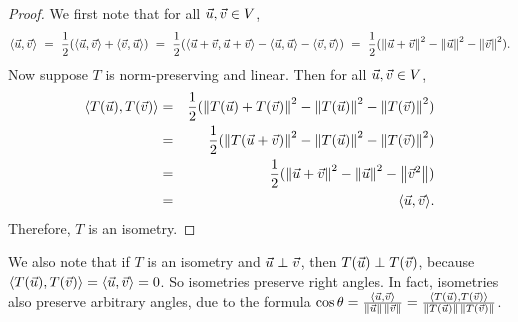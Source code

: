 \documentclass{ximera}
\begin{document}
\begin{proof}
  We first note that for all $\vec{u},\vec{v}\in V$,
  \begin{equation*}
    \langle \vec{u},\vec{v} \rangle
    ~=~ \frac{1}{2}(\langle \vec{u},\vec{v} \rangle + \langle \vec{v},\vec{u} \rangle)
    ~=~ \frac{1}{2}(\langle \vec{u}+\vec{v},\vec{u}+\vec{v} \rangle
    - \langle \vec{u},\vec{u} \rangle - \langle \vec{v},\vec{v} \rangle)
    ~=~ \frac{1}{2}(\left\|\vec{u}+\vec{v}\right\|^2
    - \left\|\vec{u}\right\|^2 - \left\|\vec{v}\right\|^2).
  \end{equation*}
  Now suppose $T$ is norm-preserving and linear. Then for all
  $\vec{u},\vec{v}\in V$,
  \begin{eqnarray*}
    \langle T(\vec{u}),T(\vec{v}) \rangle
    &=& \frac{1}{2}(\left\|T(\vec{u})+T(\vec{v})\right\|^2 - \left\|T(\vec{u})\right\|^2 -
        \left\|T(\vec{v})\right\|^2) \\
    &=& \frac{1}{2}(\left\|T(\vec{u}+\vec{v})\right\|^2 - \left\|T(\vec{u})\right\|^2 -
        \left\|T(\vec{v})\right\|^2) \\
    &=& \frac{1}{2}(\left\|\vec{u}+\vec{v}\right\|^2 -
        \left\|\vec{u}\right\|^2 - \left\|\vec{v}^2\right\|) \\
    &=& \langle \vec{u},\vec{v} \rangle.
  \end{eqnarray*}
  Therefore, $T$ is an isometry.
\end{proof}

We also note that if $T$ is an isometry and $\vec{u}\perp\vec{v}$,
then $T(\vec{u})\perp T(\vec{v})$, because
$\langle T(\vec{u}),T(\vec{v}) \rangle = \langle \vec{u},\vec{v} \rangle = 0$. So
isometries preserve right angles. In fact, isometries also preserve
arbitrary angles, due to the formula
$\cos\theta =
\frac{\langle \vec{u},\vec{v} \rangle}{\left\|\vec{u}\right\|\,\left\|\vec{v}\right\|} =
\frac{\langle T(\vec{u}),T(\vec{v}) \rangle}
{\left\|T(\vec{u})\right\|\,\left\|T(\vec{v})\right\|}$.
\end{document}
